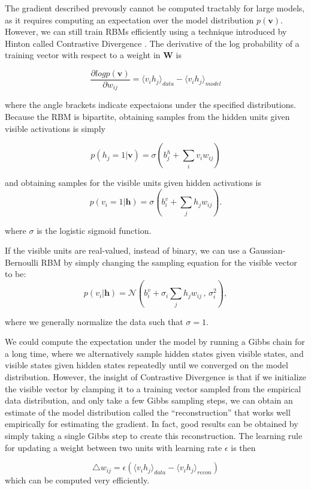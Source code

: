 \documentclass{article}
\begin{document}
The gradient described prevously cannot be computed tractably for large models,
as it requires computing an expectation over the model distribution
$p(\mathbf{v})$.  However, we can still train RBMs efficiently using a
technique introduced by Hinton called Contrastive Divergence
\cite{hinton_contrastivedivergence}. The derivative of the log probability of a
training vector with respect to a weight in $\mathbf{W}$ is 

\[
  \frac{\partial log p(\mathbf{v})}{\partial w_{ij}} = 
  \langle v_i h_j \rangle_{data} - \langle v_i h_j \rangle_{model}
\]

where the angle brackets indicate expectaions under the specified distributions.
Because the RBM is bipartite, obtaining samples from the hidden units given
visible activations is simply

\[
  p (h_j = 1 | \mathbf{v}) = \sigma(b_{j}^{h} + \sum_i v_{i} w_{ij})
\]

and obtaining samples for the visible units given hidden activations is
\[
  p (v_i = 1 | \mathbf{h}) = \sigma(b_{i}^{v} + \sum_j h_j w_{ij}).
\]

where $\sigma$ is the logistic sigmoid function.

If the visible units are real-valued, instead of binary, we can use a
Gaussian-Bernoulli RBM by simply changing the sampling equation for the visible
vector to be:
\[
  p (v_i | \mathbf{h}) = \mathcal{N} \left( b_{i}^{v} +
    \sigma_i \sum_j h_j w_{ij} \,,\, \sigma_i^2 \right),
\]

where we generally normalize the data such that $\sigma = 1$.

We could compute the expectation under the model by running a Gibbs chain for a
long time, where we alternatively sample hidden states given visible states,
and visible states given hidden states repeatedly until we converged on the
model distribution. However, the insight of Contrastive Divergence is that if
we initialize the visible vector by clamping it to a training vector sampled
from the empirical data distribution, and only take a few Gibbs sampling steps,
we can obtain an estimate of the model distribution called the
``reconstruction'' that works well empirically for estimating the gradient. In
fact, good results can be obtained by simply taking a single Gibbs step to
create this reconstruction. The learning rule for updating a weight between two
units with learning rate $\epsilon$ is then

\[
  \triangle w_{ij} = \epsilon( 
  \langle v_i h_j \rangle_{data} - \langle v_i h_j \rangle_{recon}
  )
\]
which can be computed very efficiently.
\end{document}
